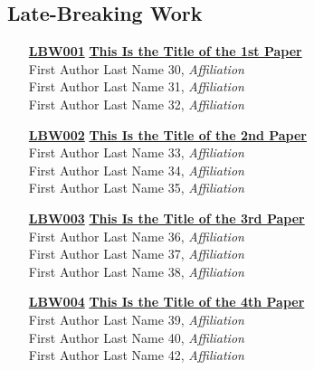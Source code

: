 \subsection{Late-Breaking Work}
\begin{enumerate}
\item[\href{https://doi.org/10.1145/1111111.1111120}{\textbf{LBW001}}]
\href{https://doi.org/10.1145/1111111.1111120}{\textbf{This Is the Title of the 1st Paper}}\\
First Author Last Name 30, \emph{Affiliation}\\
First Author Last Name 31, \emph{Affiliation}\\
First Author Last Name 32, \emph{Affiliation}\\

\item[\href{https://doi.org/10.1145/1111111.1111121}{\textbf{LBW002}}]
\href{https://doi.org/10.1145/1111111.1111121}{\textbf{This Is the Title of the 2nd Paper}}\\
First Author Last Name 33, \emph{Affiliation}\\
First Author Last Name 34, \emph{Affiliation}\\
First Author Last Name 35, \emph{Affiliation}\\

\item[\href{https://doi.org/10.1145/1111111.1111122}{\textbf{LBW003}}]
\href{https://doi.org/10.1145/1111111.1111122}{\textbf{This Is the Title of the 3rd Paper}}\\
First Author Last Name 36, \emph{Affiliation}\\
First Author Last Name 37, \emph{Affiliation}\\
First Author Last Name 38, \emph{Affiliation}\\

\item[\href{https://doi.org/10.1145/1111111.1111123}{\textbf{LBW004}}]
\href{https://doi.org/10.1145/1111111.1111123}{\textbf{This Is the Title of the 4th Paper}}\\
First Author Last Name 39, \emph{Affiliation}\\
First Author Last Name 40, \emph{Affiliation}\\
First Author Last Name 42, \emph{Affiliation}\\
\end{enumerate}


